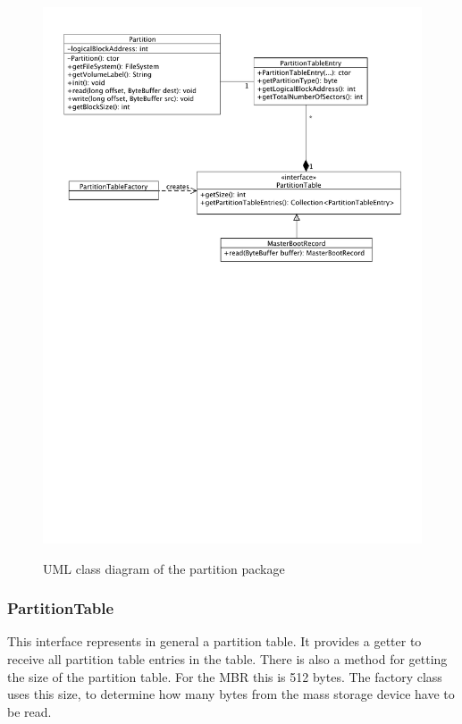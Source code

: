 \begin{figure}[h!]
\caption{UML class diagram of the partition package}
\centering
\includegraphics[scale=0.8]{figures/partition_package}
\label{figure:partition_package}
\end{figure}

\subsubsection{PartitionTable}

This interface represents in general a partition table. It provides a getter to receive all partition table entries in the table. There is also a method for getting the size of the partition table. For the MBR this is 512 bytes. The factory class uses this size, to determine how many bytes from the mass storage device have to be read.

